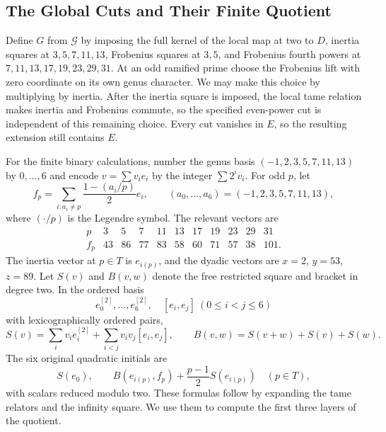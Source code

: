 \subsection{The Global Cuts and Their Finite Quotient}
Define $G$ from $\mathcal G$ by imposing the full kernel of the local
map at two to $D$, inertia squares at $3,5,7,11,13$, Frobenius squares
at $3,5$, and Frobenius fourth powers at
$7,11,13,17,19,23,29,31$. At an odd ramified prime choose the Frobenius
lift with zero coordinate on its own genus character. We may make this
choice by multiplying by inertia. After the inertia square is imposed, the
local tame relation makes inertia and Frobenius commute, so the specified
even-power cut is independent of this remaining choice. Every cut
vanishes in $E$, so the resulting extension still contains $E$.

For the finite binary calculations, number the genus basis
$(-1,2,3,5,7,11,13)$ by $0,\ldots,6$ and encode
$v=\sum v_ie_i$ by the integer $\sum 2^iv_i$. For odd $p$, let
\[
 f_p=\sum_{i:a_i\ne p}\frac{1-(a_i/p)}2e_i,
 \qquad (a_0,\ldots,a_6)=(-1,2,3,5,7,11,13),
\]
where $(\cdot/p)$ is the Legendre symbol. The relevant vectors are
\[
\begin{array}{c|rrrrrrrrrr}
 p&3&5&7&11&13&17&19&23&29&31\\\hline
 f_p&43&86&77&83&58&60&71&57&38&101.
\end{array}
\]
The inertia vector at $p\in T$ is $e_{i(p)}$, and the dyadic vectors are
$x=2$, $y=53$, $z=89$. Let $S(v)$ and $B(v,w)$ denote the free
restricted square and bracket in degree two. In the ordered basis
\[
 e_0^{[2]},\ldots,e_6^{[2]},\quad [e_i,e_j]\ (0\le i<j\le6)
\]
with lexicographically ordered pairs,
\[
 S(v)=\sum_i v_i e_i^{[2]}+\sum_{i<j}v_iv_j[e_i,e_j],\qquad
 B(v,w)=S(v+w)+S(v)+S(w).
\]
The six original quadratic initials are
\[
 S(e_0),\qquad
 B(e_{i(p)},f_p)+\frac{p-1}{2}S(e_{i(p)})\quad(p\in T),
\]
with scalars reduced modulo two. These formulas follow by expanding the tame
relators and the infinity
square. We use them to compute the first three layers of the quotient.

